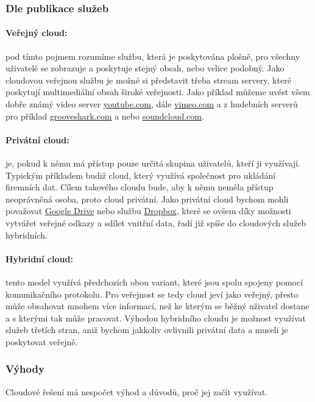 \subsubsection{Dle publikace služeb}

\paragraph{Veřejný cloud:} pod tímto pojmem rozumíme službu, která je poskytována plošně, pro všechny uživatelé se zobrazuje a poskytuje stejný obsah, nebo velice podobný. Jako cloudovou veřejnou službu je možné si představit třeba stream servery, které poskytují multimediální obsah široké veřejnosti. Jako příklad můžeme uvést všem dobře známý video server  \href{http://youtube.com}{youtube.com}, dále \href{http://vimeo.com}{vimeo.com} a z hudebních serverů pro příklad \href{http://grooveshark.com}{grooveshark.com} a nebo \href{http://soundcloud.com}{soundcloud.com}.

\paragraph{Privátní cloud:} je, pokud k němu má přístup pouze určitá skupina uživatelů, kteří ji využívají. Typickým příkladem budiž cloud, který využívá společnost pro ukládání firemních dat. Cílem takového cloudu bude, aby k němu neměla přístup neoprávněná osoba, proto cloud privátní. Jako privátní cloud bychom mohli považovat \href{https://drive.google.com}{Google Drive} nebo službu \href{https://dropbox.com/}{Dropbox}, které se ovšem díky možnosti vytvářet veřejné odkazy a sdílet vnitřní data, řadí již spíše do cloudových služeb hybridních.

\paragraph{Hybridní cloud:} tento model využívá předchozích obou variant, které jsou spolu spojeny pomocí komunikačního protokolu. Pro veřejnost se tedy cloud jeví jako veřejný, přesto může obsahovat mnohem více informací, než ke kterým se běžný uživatel dostane a s kterými tak může pracovat.
Výhodou hybridního cloudu je možnost využívat služeb třetích stran, aniž bychom jakkoliv ovlivnili privátní data a museli je poskytovat veřejně.

\subsubsection{Výhody}
Cloudové řešení má nespočet výhod a důvodů, proč jej začít využívat.

